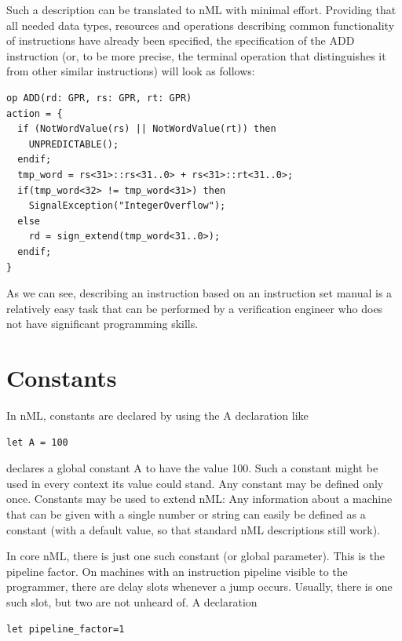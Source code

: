 \documentclass[oneside,final,14pt]{extreport}
\begin{document}
Such a description can be translated to nML with minimal effort. Providing that
all needed data types, resources and operations describing common functionality
of instructions have already been specified, the specification of the ADD
instruction (or, to be more precise, the terminal operation that distinguishes 
it from other similar instructions) will look as follows:

\begin{lstlisting}
op ADD(rd: GPR, rs: GPR, rt: GPR)
action = {
  if (NotWordValue(rs) || NotWordValue(rt)) then
    UNPREDICTABLE();
  endif;
  tmp_word = rs<31>::rs<31..0> + rs<31>::rt<31..0>;
  if(tmp_word<32> != tmp_word<31>) then
    SignalException("IntegerOverflow");
  else
    rd = sign_extend(tmp_word<31..0>);
  endif;
}
\end{lstlisting}

As we can see, describing an instruction based on an instruction set manual is
a relatively easy task that can be performed by a verification engineer who
does not have significant programming skills.


\section{Constants}

In nML, constants are declared by using the A declaration like

\begin{lstlisting}
let A = 100
\end{lstlisting}

declares a global constant A to have the value 100. Such a constant might be used in every
context its value could stand. Any constant may be defined only once. Constants may be used
to extend nML: Any information about a machine that can be given with a single number
or string can easily be defined as a constant (with a default value, so that standard
nML descriptions still work).

In core nML, there is just one such constant (or global parameter).
This is the pipeline factor. On machines with an instruction pipeline visible to the programmer,
there are delay slots whenever a jump occurs. Usually, there is one such slot, but two are not
unheard of. A declaration

\begin{lstlisting}
let pipeline_factor=1
\end{lstlisting}
\end{document}
